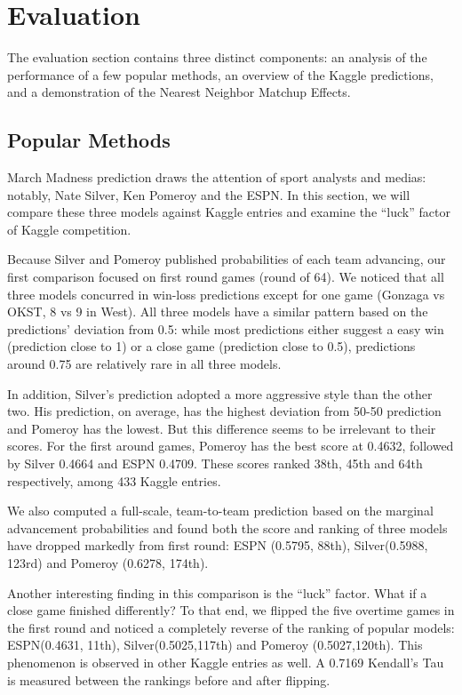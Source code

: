 \section{Evaluation}
The evaluation section contains three distinct components: an analysis of the performance of a few popular methods, an overview of the Kaggle predictions, and a demonstration of the Nearest Neighbor Matchup Effects.
\subsection{Popular Methods}
March Madness prediction draws the attention of sport analysts and medias: notably, Nate Silver, Ken Pomeroy and the ESPN. In this section, we will compare these three models against Kaggle entries and examine the ``luck'' factor of Kaggle competition.

Because Silver and Pomeroy published probabilities of each team advancing, our first comparison focused on first round games (round of 64).  We noticed that all three models concurred in win-loss predictions except for one game (Gonzaga vs OKST, 8 vs 9 in West). All three models have a similar pattern based on the predictions' deviation from 0.5: while most predictions either suggest a easy win (prediction close to 1) or a close game (prediction close to 0.5), predictions around 0.75 are relatively rare in all three models.

In addition, Silver's prediction adopted a more aggressive style than the other two. His prediction, on average, has the highest deviation from 50-50 prediction and Pomeroy has the lowest. But this difference seems to be irrelevant to their scores. For the first around games, Pomeroy has the best score at 0.4632, followed by Silver 0.4664 and ESPN 0.4709. These scores ranked 38th, 45th and 64th respectively, among 433 Kaggle entries. 

We also computed a full-scale, team-to-team prediction based on the marginal advancement probabilities and found both the score and ranking of three models have dropped markedly from first round: ESPN (0.5795, 88th), Silver(0.5988, 123rd) and Pomeroy (0.6278, 174th). 

Another interesting finding in this comparison is the ``luck'' factor. What if a close game finished differently? To that end, we flipped the five overtime games in the first round and noticed a completely reverse of the ranking of popular models: ESPN(0.4631, 11th), Silver(0.5025,117th) and Pomeroy (0.5027,120th). This phenomenon is observed in other Kaggle entries as well. A 0.7169 Kendall's Tau is measured between the rankings before and after flipping. 

